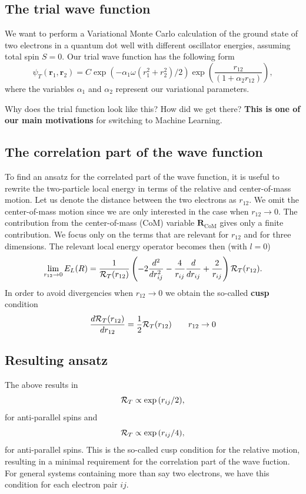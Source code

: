 \documentclass[%
oneside,                 %
final,                   %
10pt]{article}
\begin{document}
\subsection{The trial wave function}
\begin{block}{}
We want to perform  a Variational Monte Carlo calculation of the ground state of two electrons in a quantum dot well with different oscillator energies, assuming total spin $S=0$.
Our trial wave function has the following form
\begin{equation}
   \psi_{T}(\bm{r}_1,\bm{r}_2) = 
   C\exp{\left(-\alpha_1\omega(r_1^2+r_2^2)/2\right)}
   \exp{\left(\frac{r_{12}}{(1+\alpha_2 r_{12})}\right)}, 
\label{eq:trial}
\end{equation}
where the variables $\alpha_1$ and $\alpha_2$ represent our variational parameters.

Why does the trial function look like this? How did we get there? \textbf{This is one of our main motivations} for switching to
Machine Learning.

\end{block}

\subsection{The correlation part of the wave function}

To find an ansatz for the correlated part of the wave function, it is useful to rewrite the two-particle
local energy in terms of the relative and center-of-mass motion.
Let us denote the distance between the two electrons as
$r_{12}$. We omit the center-of-mass motion since we are only interested in the case when
$r_{12} \rightarrow 0$. The contribution from the center-of-mass (CoM) variable $\bm{R}_{\mathrm{CoM}}$
gives only a finite contribution.
We focus only on the terms that are relevant for $r_{12}$ and for three dimensions. The relevant local energy operator becomes then (with $l=0$)
\[
\lim_{r_{12} \rightarrow 0}E_L(R)=
    \frac{1}{{\cal R}_T(r_{12})}\left(-2\frac{d^2}{dr_{ij}^2}-\frac{4}{r_{ij}}\frac{d}{dr_{ij}}+
\frac{2}{r_{ij}}\right){\cal R}_T(r_{12}).
\]
In order to avoid divergencies when $r_{12}\rightarrow 0$ we obtain  the so-called \textbf{cusp} condition
\[
\frac{d {\cal R}_T(r_{12})}{dr_{12}} = \frac{1}{2}
{\cal R}_T(r_{12})\qquad r_{12}\to 0
\]

\subsection{Resulting ansatz}
The above  results in
\[
{\cal R}_T  \propto \exp{(r_{ij}/2)}, 
\]
for anti-parallel spins and 
\[
{\cal R}_T  \propto \exp{(r_{ij}/4)}, 
\]
for anti-parallel spins. 
This is the so-called cusp condition for the relative motion, resulting in a minimal requirement
for the correlation part of the wave fuction.
For general systems containing more than say two electrons, we have this
condition for each electron pair $ij$.
\end{document}
